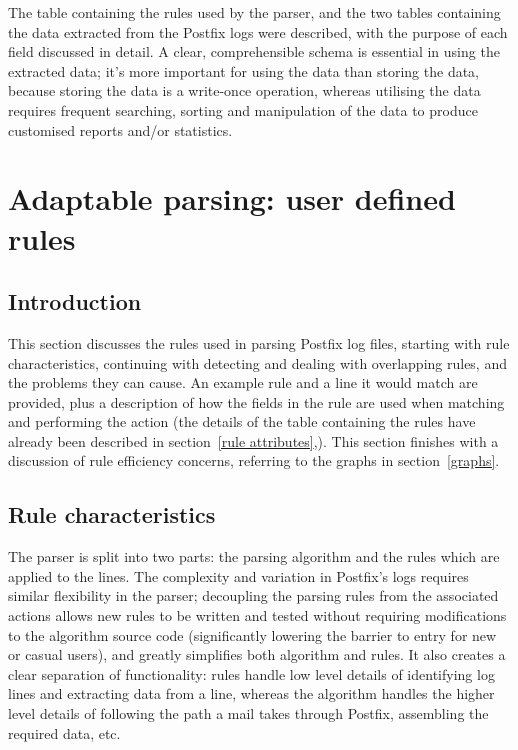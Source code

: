 \documentclass[a4paper,12pt,draft]{article}
\begin{document}
The table containing the rules used by the parser, and the two tables
containing the data extracted from the Postfix logs were described, with
the purpose of each field discussed in detail.  A clear, comprehensible
schema is essential in using the extracted data; it's more important for
using the data than storing the data, because storing the data is a
write-once operation, whereas utilising the data requires frequent
searching, sorting and manipulation of the data to produce customised
reports and/or statistics.

\section{Adaptable parsing: user defined rules}

\label{rules}

\subsection{Introduction}

This section discusses the rules used in parsing Postfix log files,
starting with rule characteristics, continuing with detecting and dealing
with overlapping rules, and the problems they can cause.  An example rule
and a line it would match are provided, plus a description of how the
fields in the rule are used when matching and performing the action (the
details of the table containing the rules have already been described in
section~\ref{rule attributes},).  This section finishes with a discussion
of rule efficiency concerns, referring to the graphs in
section~\ref{graphs}.


\subsection{Rule characteristics}

The parser is split into two parts: the parsing algorithm and the rules
which are applied to the lines.  The complexity and variation in Postfix's
logs requires similar flexibility in the parser; decoupling the parsing
rules from the associated actions allows new rules to be written and tested
without requiring modifications to the algorithm source code (significantly
lowering the barrier to entry for new or casual users), and greatly
simplifies both algorithm and rules.  It also creates a clear separation of
functionality: rules handle low level details of identifying log lines and
extracting data from a line, whereas the algorithm handles the higher level
details of following the path a mail takes through Postfix, assembling the
required data, etc.
\end{document}
